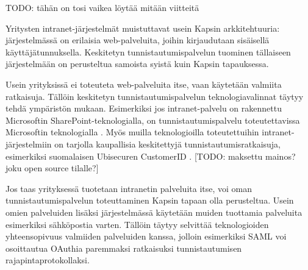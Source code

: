 TODO: tähän on tosi vaikea löytää mitään viitteitä

Yritysten intranet-järjestelmät muistuttavat usein Kapsin arkkitehtuuria: järjestelmässä on erilaisia web-palveluita, joihin kirjaudutaan sisäisellä käyttäjätunnuksella. Keskitetyn tunnistautumispalvelun tuominen tällaiseen järjestelmään on perusteltua samoista syistä kuin Kapsin tapauksessa.

Usein yrityksissä ei toteuteta web-palveluita itse, vaan käytetään valmiita ratkaisuja. Tällöin keskitetyn tunnistautumispalvelun teknologiavalinnat täytyy tehdä ympäristön mukaan. Esimerkiksi jos intranet-palvelu on rakennettu Microsoftin SharePoint-teknologialla, on tunnistautumispalvelu toteutettavissa Microsoftin teknologialla \cite{sharepoint}. Myös muilla teknologioilla toteutettuihin intranet-järjestelmiin on tarjolla kaupallisia keskitettyjä tunnistautumisratkaisuja, esimerkiksi suomalaisen Ubisecuren CustomerID \cite{ubisecure}. [TODO: maksettu mainos? joku open source tilalle?]

Jos taas yrityksessä tuotetaan intranetin palveluita itse, voi oman tunnistautumispalvelun toteuttaminen Kapsin tapaan olla perusteltua. Usein omien palveluiden lisäksi järjestelmässä käytetään muiden tuottamia palveluita esimerkiksi sähköpostia varten. Tällöin täytyy selvittää teknologioiden yhteensopivuus valmiiden palveluiden kanssa, jolloin esimerkiksi SAML voi osoittautua OAuthia paremmaksi ratkaisuksi tunnistautumisen rajapintaprotokollaksi.